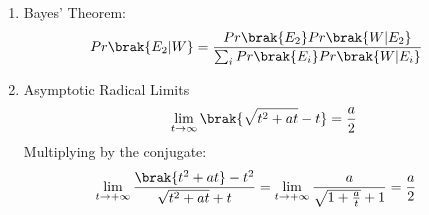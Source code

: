 \begin{enumerate}[label=\thesubsection.\arabic*, ref=\thesubsection.\theenumi]
	
	
	\item Bayes' Theorem:
	\begin{align}
		Pr\brak{E_2|W} &= \frac{Pr\brak{E_2}Pr\brak{W|E_2}}{\sum_{i}Pr\brak{E_i}Pr\brak{W|E_i}} \label{eq:DA2025-bayes_setup}
	\end{align}
	
	\item Asymptotic Radical Limits
	\begin{align}
		\lim_{t \to \infty} \brak{\sqrt{t^2 + at} - t} = \frac{a}{2} \label{eq:DA2025-radical_limit}
	\end{align}
	\solution
	Multiplying by the conjugate:
	\begin{align}
		\lim_{t \to +\infty} \frac{\brak{t^2 + at} - t^2}{\sqrt{t^2 + at} + t} &= \lim_{t \to +\infty} \frac{a}{\sqrt{1 + \frac{a}{t}} + 1} = \frac{a}{2}
	\end{align}
	

\end{enumerate}
